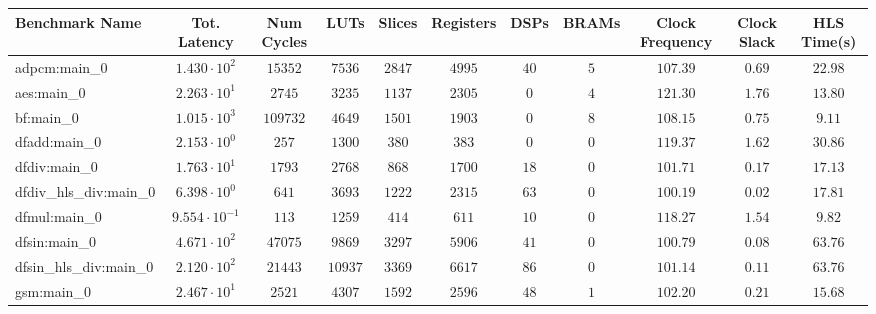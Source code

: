 \begin{tabular}{|l|c|c|c|c|c|c|c|c|c|c|}
\hline
Benchmark Name          & Tot. Latency            & Num Cycles & LUTs      & Slices    & Registers & DSPs    & BRAMs  & Clock Frequency & Clock Slack & HLS Time(s) \\
\hline
adpcm:main\_0           & $ 1.430 \cdot 10^{2}  $ & $ 15352  $ & $ 7536  $ & $ 2847  $ & $ 4995  $ & $ 40  $ & $ 5  $ & $ 107.39      $ & $ 0.69    $ & $ 22.98   $ \\
aes:main\_0             & $ 2.263 \cdot 10^{1}  $ & $ 2745   $ & $ 3235  $ & $ 1137  $ & $ 2305  $ & $ 0   $ & $ 4  $ & $ 121.30      $ & $ 1.76    $ & $ 13.80   $ \\
bf:main\_0              & $ 1.015 \cdot 10^{3}  $ & $ 109732 $ & $ 4649  $ & $ 1501  $ & $ 1903  $ & $ 0   $ & $ 8  $ & $ 108.15      $ & $ 0.75    $ & $ 9.11    $ \\
dfadd:main\_0           & $ 2.153 \cdot 10^{0}  $ & $ 257    $ & $ 1300  $ & $ 380   $ & $ 383   $ & $ 0   $ & $ 0  $ & $ 119.37      $ & $ 1.62    $ & $ 30.86   $ \\
dfdiv:main\_0           & $ 1.763 \cdot 10^{1}  $ & $ 1793   $ & $ 2768  $ & $ 868   $ & $ 1700  $ & $ 18  $ & $ 0  $ & $ 101.71      $ & $ 0.17    $ & $ 17.13   $ \\
dfdiv\_hls\_div:main\_0 & $ 6.398 \cdot 10^{0}  $ & $ 641    $ & $ 3693  $ & $ 1222  $ & $ 2315  $ & $ 63  $ & $ 0  $ & $ 100.19      $ & $ 0.02    $ & $ 17.81   $ \\
dfmul:main\_0           & $ 9.554 \cdot 10^{-1} $ & $ 113    $ & $ 1259  $ & $ 414   $ & $ 611   $ & $ 10  $ & $ 0  $ & $ 118.27      $ & $ 1.54    $ & $ 9.82    $ \\
dfsin:main\_0           & $ 4.671 \cdot 10^{2}  $ & $ 47075  $ & $ 9869  $ & $ 3297  $ & $ 5906  $ & $ 41  $ & $ 0  $ & $ 100.79      $ & $ 0.08    $ & $ 63.76   $ \\
dfsin\_hls\_div:main\_0 & $ 2.120 \cdot 10^{2}  $ & $ 21443  $ & $ 10937 $ & $ 3369  $ & $ 6617  $ & $ 86  $ & $ 0  $ & $ 101.14      $ & $ 0.11    $ & $ 63.76   $ \\
gsm:main\_0             & $ 2.467 \cdot 10^{1}  $ & $ 2521   $ & $ 4307  $ & $ 1592  $ & $ 2596  $ & $ 48  $ & $ 1  $ & $ 102.20      $ & $ 0.21    $ & $ 15.68   $ \\

\end{tabular}
